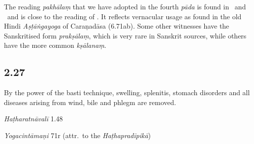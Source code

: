 \begin{ekdosis}
\begin{testimonia}[hp02_026]
\begin{versinnote}
\end{versinnote}

\end{testimonia}

\begin{philcomm}[hp02_026]
The reading \emph{pakhālaṃ} that we have adopted in the fourth \emph{pāda} is found in \alphaTwo\ and \betaOmega\ and is close to the reading of \alphaOne. %
It reflects vernacular usage as found in the old Hindi \emph{Aṣṭāṅgayoga} of Caraṇadāsa (6.71ab). Some other witnesses have the Sanskritised form \emph{prakṣālaṃ}, which is very rare in Sanskrit sources, while others have the more common \emph{kṣālanaṃ}.

\end{philcomm}

\subsection*{2.27}
\begin{translation}[hp02_027]
By the power of the basti technique, swelling, splenitis, stomach disorders and all diseases arising from wind, bile and phlegm are removed.
\end{translation}


\begin{testimonia}[hp02_027]
\emph{Haṭharatnāvalī} 1.48

\begin{versinnote}
\end{versinnote}

\emph{Yogacintāmaṇi} 71r (attr.~to the \emph{Haṭhapradīpikā})

\begin{versinnote}
\end{versinnote}


\end{testimonia}
\end{ekdosis}
